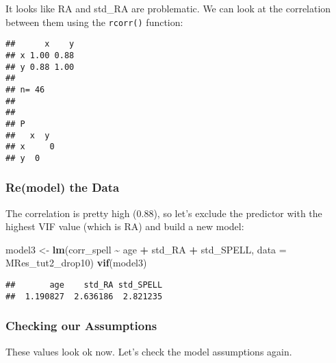 \documentclass[
]{book}
\newenvironment{Shaded}{\begin{snugshade}}{\end{snugshade}}
\newcommand{\AttributeTok}[1]{\textcolor[rgb]{0.13,0.29,0.53}{#1}}
\newcommand{\FunctionTok}[1]{\textcolor[rgb]{0.13,0.29,0.53}{\textbf{#1}}}
\newcommand{\NormalTok}[1]{#1}
\newcommand{\OtherTok}[1]{\textcolor[rgb]{0.56,0.35,0.01}{#1}}
\newcommand{\SpecialCharTok}[1]{\textcolor[rgb]{0.81,0.36,0.00}{\textbf{#1}}}
\begin{document}
It looks like RA and std\_RA are problematic. We can look at the correlation between them using the \texttt{rcorr()} function:

\begin{Shaded}
\end{Shaded}

\begin{verbatim}
##      x    y
## x 1.00 0.88
## y 0.88 1.00
## 
## n= 46 
## 
## 
## P
##   x  y 
## x     0
## y  0
\end{verbatim}

\hypertarget{remodel-the-data-1}{%
\subsubsection*{Re(model) the Data}\label{remodel-the-data-1}}

The correlation is pretty high (0.88), so let's exclude the predictor with the highest VIF value (which is RA) and build a new model:

\begin{Shaded}
\begin{Highlighting}[]
\NormalTok{model3 }\OtherTok{\textless{}{-}} \FunctionTok{lm}\NormalTok{(corr\_spell }\SpecialCharTok{\textasciitilde{}}\NormalTok{ age }\SpecialCharTok{+}\NormalTok{ std\_RA }\SpecialCharTok{+}\NormalTok{ std\_SPELL, }\AttributeTok{data =}\NormalTok{ MRes\_tut2\_drop10)}
\FunctionTok{vif}\NormalTok{(model3)}
\end{Highlighting}
\end{Shaded}

\begin{verbatim}
##       age    std_RA std_SPELL 
##  1.190827  2.636186  2.821235
\end{verbatim}

\hypertarget{checking-our-assumptions-3}{%
\subsubsection*{Checking our Assumptions}\label{checking-our-assumptions-3}}

These values look ok now. Let's check the model assumptions again.
\end{document}
